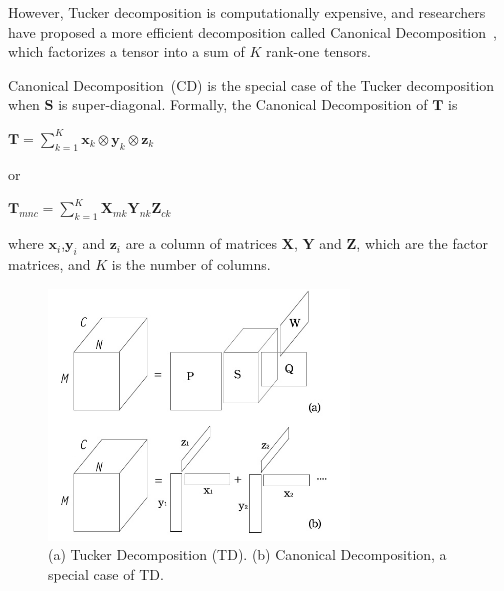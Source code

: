 
However, Tucker decomposition is computationally expensive, and researchers have proposed a more efficient decomposition called Canonical Decomposition~\cite{carroll1970analysis}, which factorizes a tensor into a sum of $K$ rank-one tensors.

Canonical Decomposition~(CD) is the special case of the Tucker decomposition when $\mathbf{S}$ is super-diagonal.
Formally, the Canonical Decomposition of $\mathbf{T}$ is
\begin{center}
$\mathbf{T}=\sum\limits_{k=1}^{K}\mathbf{x}_k\otimes \mathbf{y}_k\otimes \mathbf{z}_k$
\end{center}
or
\begin{center}
$\mathbf{T}_{mnc}=\sum\limits_{k=1}^{K}\mathbf{X}_{m k} \mathbf{Y}_{n k} \mathbf{Z}_{c k}$
\end{center}
where $\mathbf{x}_i$,$\mathbf{y}_i$ and $\mathbf{z}_i$ are a column of matrices $\mathbf{X}$, $\mathbf{Y}$ and $\mathbf{Z}$, which are the factor matrices, and $K$ is the number of columns. 

\begin{figure}[h] 
\includegraphics[width=8cm]{tf.jpg} 
\caption{(a) Tucker Decomposition (TD). (b) Canonical Decomposition, a special case of TD.}
\label{fig:tf:tuckcanon} 
\end{figure}

